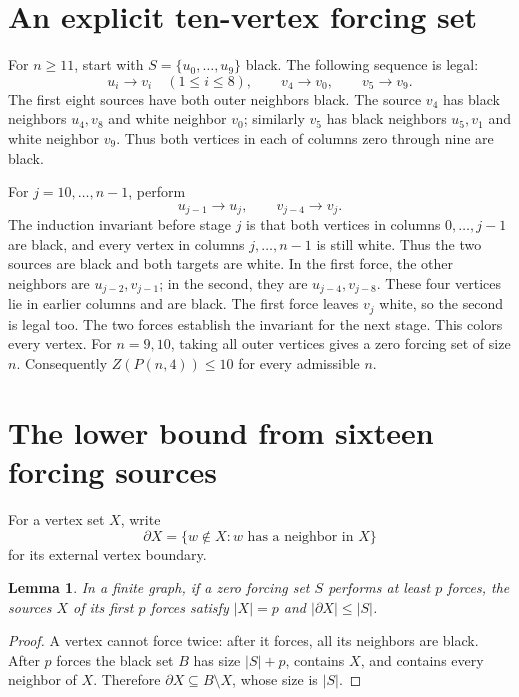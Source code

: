 \documentclass[10pt,a4paper]{article}
\newtheorem{lemma}[theorem]{Lemma}
\newcommand{\bd}{\partial}
\newcommand{\card}[1]{\lvert#1\rvert}
\newcommand{\ZF}{Z}
\begin{document}
\section{An explicit ten-vertex forcing set}
For $n\ge11$, start with $S=\{u_0,\ldots,u_9\}$ black. The following
sequence is legal:
\[
u_i\longrightarrow v_i\quad(1\le i\le8),\qquad
v_4\longrightarrow v_0,\qquad v_5\longrightarrow v_9.
\]
The first eight sources have both outer neighbors black. The source $v_4$
has black neighbors $u_4,v_8$ and white neighbor $v_0$; similarly $v_5$
has black neighbors $u_5,v_1$ and white neighbor $v_9$. Thus both vertices
in each of columns zero through nine are black.

For $j=10,\ldots,n-1$, perform
\[
u_{j-1}\longrightarrow u_j,\qquad
v_{j-4}\longrightarrow v_j.
\]
The induction invariant before stage $j$ is that both vertices in columns
$0,\ldots,j-1$ are black, and every vertex in columns $j,\ldots,n-1$
is still white. Thus the two sources are black and both targets are white.
In the first force, the other neighbors are $u_{j-2},v_{j-1}$;
in the second, they are $u_{j-4},v_{j-8}$. These four vertices lie in earlier
columns and are black. The first force leaves $v_j$ white, so the second
is legal too. The two forces establish the invariant for the next stage.
This colors every vertex. For $n=9,10$, taking all outer vertices gives
a zero forcing set of size $n$. Consequently $\ZF(P(n,4))\le10$ for
every admissible $n$.

\section{The lower bound from sixteen forcing sources}
For a vertex set $X$, write
\[
\bd X=\{w\notin X:\text{$w$ has a neighbor in $X$}\}
\]
for its external vertex boundary.

\begin{lemma}\label{first}
In a finite graph, if a zero forcing set $S$ performs at least $p$ forces,
the sources $X$ of its first $p$ forces satisfy
$\card X=p$ and $\card{\bd X}\le\card S$.
\end{lemma}
\begin{proof}
A vertex cannot force twice: after it forces, all its neighbors are black.
After $p$ forces the black set $B$ has size $\card S+p$, contains $X$, and
contains every neighbor of $X$. Therefore
$\bd X\subseteq B\setminus X$, whose size is $\card S$.
\end{proof}
\end{document}
